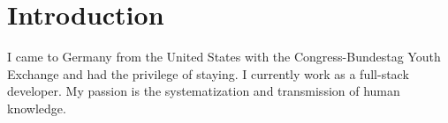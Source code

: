 
\section{Introduction}

{ I came to Germany from the United States with the Congress-Bundestag Youth Exchange and had the privilege of staying. I currently work as a full-stack developer. My passion is the systematization and transmission of human knowledge. }
